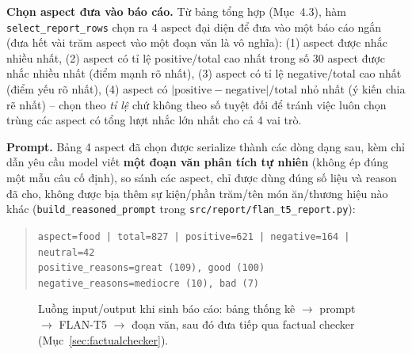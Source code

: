 \documentclass[11pt,a4paper]{article}
\begin{document}
\textbf{Chọn aspect đưa vào báo cáo.} Từ bảng tổng hợp (Mục~4.3), hàm
\texttt{select\_report\_rows} chọn ra 4 aspect đại diện để đưa vào một báo
cáo ngắn (đưa hết vài trăm aspect vào một đoạn văn là vô nghĩa): (1) aspect
được nhắc nhiều nhất, (2) aspect có tỉ lệ positive/total cao nhất trong số
30 aspect được nhắc nhiều nhất (điểm mạnh rõ nhất), (3) aspect có tỉ lệ
negative/total cao nhất (điểm yếu rõ nhất), (4) aspect có
$|\text{positive} - \text{negative}| / \text{total}$ nhỏ nhất (ý kiến chia
rẽ nhất) -- chọn theo \emph{tỉ lệ} chứ không theo số tuyệt đối để tránh việc
luôn chọn trùng các aspect có tổng lượt nhắc lớn nhất cho cả 4 vai trò.

\textbf{Prompt.} Bảng 4 aspect đã chọn được serialize thành các dòng dạng
sau, kèm chỉ dẫn yêu cầu model viết \textbf{một đoạn văn phân tích tự
nhiên} (không ép đúng một mẫu câu cố định), so sánh các aspect, chỉ được
dùng đúng số liệu và reason đã cho, không được bịa thêm sự kiện/phần
trăm/tên món ăn/thương hiệu nào khác
(\texttt{build\_reasoned\_prompt} trong \texttt{src/\allowbreak report/\allowbreak flan\_\allowbreak t5\_\allowbreak report.py}):

\begin{quote}
\small
\texttt{aspect=food | total=827 | positive=621 | negative=164 | neutral=42} \\
\texttt{positive\_reasons=great (109), good (100)} \\
\texttt{negative\_reasons=mediocre (10), bad (7)}
\end{quote}

\begin{figure}[h]
\centering
{}
\caption{Luồng input/output khi sinh báo cáo: bảng thống kê $\to$ prompt
$\to$ FLAN-T5 $\to$ đoạn văn, sau đó đưa tiếp qua factual checker
(Mục~\ref{sec:factualchecker}).}
\end{figure}
\end{document}
